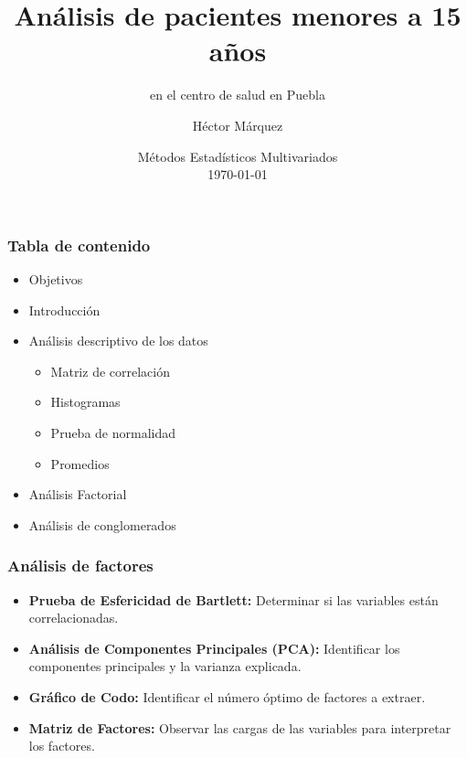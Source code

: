 \documentclass[
	11pt, %
]{beamer}
\title[Análisis de pacientes]{Análisis de pacientes menores a 15 años} %
\subtitle{en el centro de salud en Puebla} %
\author[Héctor Márquez]{Héctor Márquez} %
\institute[UANL]{Universidad Autónoma de Nuevo León\\ \smallskip \textit{hector.marquez@uanl.edu.mx}} %
\date[\today]{Métodos Estadísticos Multivariados \\ \today} %
\begin{document}

\begin{frame}
	\titlepage %
\end{frame}


\begin{frame}
    \frametitle{Tabla de contenido} %
    \begin{itemize}
        \item Objetivos
        \item Introducción
        \item Análisis descriptivo de los datos
        \begin{itemize}
        	\item Matriz de correlación
        	\item Histogramas
        	\item Prueba de normalidad
        	\item Promedios
        \end{itemize}
        \item Análisis Factorial
        \item Análisis de conglomerados 
    \end{itemize}
\end{frame}




\begin{frame}
  \frametitle{Análisis de factores}

    \begin{itemize}
    \item \textbf{Prueba de Esfericidad de Bartlett:} Determinar si las variables están correlacionadas.
    \item \textbf{Análisis de Componentes Principales (PCA):} Identificar los componentes principales y la varianza explicada.
    \item \textbf{Gráfico de Codo:} Identificar el número óptimo de factores a extraer.
    \item \textbf{Matriz de Factores:} Observar las cargas de las variables para interpretar los factores.
  \end{itemize}
 
\end{frame}
\end{document}
